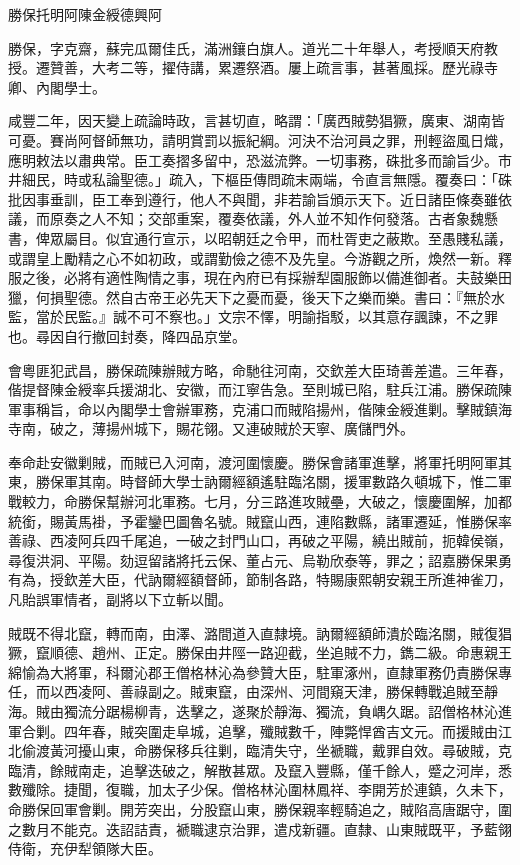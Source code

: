 
\begin{pinyinscope}
勝保托明阿陳金綬德興阿

勝保，字克齋，蘇完瓜爾佳氏，滿洲鑲白旗人。道光二十年舉人，考授順天府教授。遷贊善，大考二等，擢侍講，累遷祭酒。屢上疏言事，甚著風採。歷光祿寺卿、內閣學士。

咸豐二年，因天變上疏論時政，言甚切直，略謂：「廣西賊勢猖獗，廣東、湖南皆可憂。賽尚阿督師無功，請明賞罰以振紀綱。河決不治河員之罪，刑輕盜風日熾，應明敕法以肅典常。臣工奏摺多留中，恐滋流弊。一切事務，硃批多而諭旨少。市井細民，時或私論聖德。」疏入，下樞臣傳問疏末兩端，令直言無隱。覆奏曰：「硃批因事垂訓，臣工奉到遵行，他人不與聞，非若諭旨頒示天下。近日諸臣條奏雖依議，而原奏之人不知；交部重案，覆奏依議，外人並不知作何發落。古者象魏懸書，俾眾屬目。似宜通行宣示，以昭朝廷之令甲，而杜胥吏之蔽欺。至愚賤私議，或謂皇上勵精之心不如初政，或謂勤儉之德不及先皇。今游觀之所，煥然一新。釋服之後，必將有適性陶情之事，現在內府已有採辦犁園服飾以備進御者。夫鼓樂田獵，何損聖德。然自古帝王必先天下之憂而憂，後天下之樂而樂。書曰：『無於水監，當於民監。』誠不可不察也。」文宗不懌，明諭指駁，以其意存諷諫，不之罪也。尋因自行撤回封奏，降四品京堂。

會粵匪犯武昌，勝保疏陳辦賊方略，命馳往河南，交欽差大臣琦善差遣。三年春，偕提督陳金綬率兵援湖北、安徽，而江寧告急。至則城已陷，駐兵江浦。勝保疏陳軍事稱旨，命以內閣學士會辦軍務，克浦口而賊陷揚州，偕陳金綬進剿。擊賊鎮海寺南，破之，薄揚州城下，賜花翎。又連破賊於天寧、廣儲門外。

奉命赴安徽剿賊，而賊已入河南，渡河圍懷慶。勝保會諸軍進擊，將軍托明阿軍其東，勝保軍其南。時督師大學士訥爾經額遙駐臨洺關，援軍數路久頓城下，惟二軍戰較力，命勝保幫辦河北軍務。七月，分三路進攻賊壘，大破之，懷慶圍解，加都統銜，賜黃馬褂，予霍鑾巴圖魯名號。賊竄山西，連陷數縣，諸軍遷延，惟勝保率善祿、西凌阿兵四千尾追，一破之封門山口，再破之平陽，繞出賊前，扼韓侯嶺，尋復洪洞、平陽。劾逗留諸將托云保、董占元、烏勒欣泰等，罪之；詔嘉勝保果勇有為，授欽差大臣，代訥爾經額督師，節制各路，特賜康熙朝安親王所進神雀刀，凡貽誤軍情者，副將以下立斬以聞。

賊既不得北竄，轉而南，由澤、潞間道入直隸境。訥爾經額師潰於臨洺關，賊復猖獗，竄順德、趙州、正定。勝保由井陘一路迎截，坐追賊不力，鐫二級。命惠親王綿愉為大將軍，科爾沁郡王僧格林沁為參贊大臣，駐軍涿州，直隸軍務仍責勝保專任，而以西凌阿、善祿副之。賊東竄，由深州、河間窺天津，勝保轉戰追賊至靜海。賊由獨流分踞楊柳青，迭擊之，遂聚於靜海、獨流，負嵎久踞。詔僧格林沁進軍合剿。四年春，賊突圍走阜城，追擊，殲賊數千，陣斃悍酋吉文元。而援賊由江北偷渡黃河擾山東，命勝保移兵往剿，臨清失守，坐褫職，戴罪自效。尋破賊，克臨清，餘賊南走，追擊迭破之，解散甚眾。及竄入豐縣，僅千餘人，蹙之河岸，悉數殲除。捷聞，復職，加太子少保。僧格林沁圍林鳳祥、李開芳於連鎮，久未下，命勝保回軍會剿。開芳突出，分股竄山東，勝保親率輕騎追之，賊陷高唐踞守，圍之數月不能克。迭詔詰責，褫職逮京治罪，遣戍新疆。直隸、山東賊既平，予藍翎侍衛，充伊犁領隊大臣。


\end{pinyinscope}
